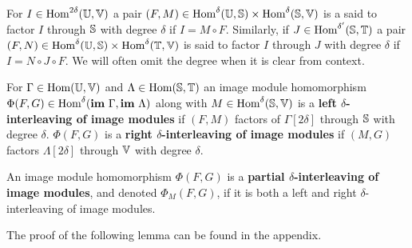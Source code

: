 For $I\in\Hom^{2\delta}(\U,\V)$ a pair $(F, M)\in \Hom^\delta(\U,\S)\times\Hom^\delta(\S,\V)$ is a said to factor $I$ through $\S$ with degree $\delta$ if $I = M\circ F$.
Similarly, if $J\in\Hom^{\delta'}(\S,\T)$ a pair $(F,N)\in\Hom^\delta(\U,\S)\times\Hom^\delta(\T,\V)$ is said to factor $I$ through $J$ with degree $\delta$ if $I = N\circ J\circ F$.
We will often omit the degree when it is clear from context.

\begin{definition}
  For $\Gamma\in\Hom(\U,\V)$ and $\Lambda\in\Hom(\S,\T)$ an image module homomorphism $\Phi(F, G)\in\Hom^\delta(\im~\Gamma,\im~\Lambda)$ along with $M\in\Hom^\delta(\S,\V)$ is a \textbf{left $\delta$-interleaving of image modules} if $(F, M)$ factors of $\Gamma[2\delta]$ through $\S$ with degree $\delta$.
  $\Phi(F, G)$ is a \textbf{right $\delta$-interleaving of image modules} if $(M, G)$ factors $\Lambda[2\delta]$ through $\V$ with degree $\delta$.

  An image module homomorphism $\Phi(F, G)$ is a \textbf{partial $\delta$-interleaving of image modules}, and denoted $\Phi_M(F, G)$, if it is both a left and right $\delta$-interleaving of image modules.
\end{definition}

The proof of the following lemma can be found in the appendix.

